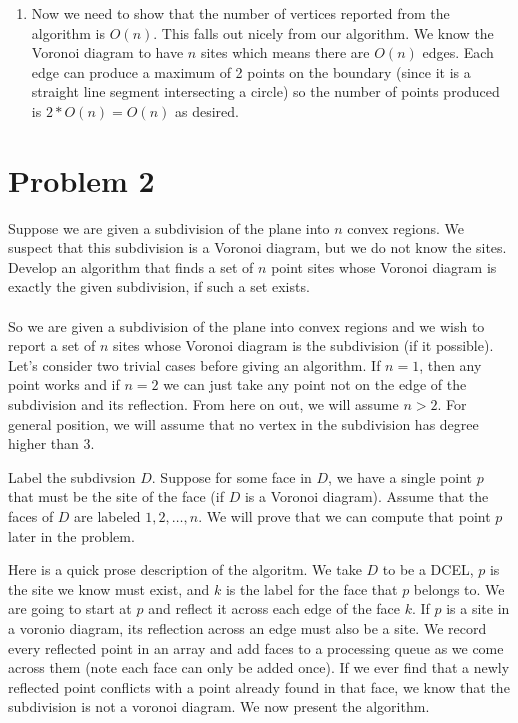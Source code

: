 \documentclass[11pt]{article}
\begin{document}
\begin{enumerate}
    \item Now we need to show that the number of vertices reported from the algorithm is $O(n)$.
    This falls out nicely from our algorithm.
    We know the Voronoi diagram to have $n$ sites which means there are $O(n)$ edges.
    Each edge can produce a maximum of 2 points on the boundary (since it is a straight line segment intersecting a circle) so the number of points produced is $2*O(n) = O(n)$ as desired.
\end{enumerate}

\newpage
\section*{Problem 2}

Suppose we are given a subdivision of the plane into $n$ convex regions. We
suspect that this subdivision is a Voronoi diagram, but we do not know the
sites. Develop an algorithm that finds a set of $n$ point sites whose Voronoi diagram is exactly the given subdivision, if such a set exists. \\\\

\answer
So we are given a subdivision of the plane into convex regions and we wish to report a set of $n$ sites whose Voronoi diagram is the subdivision (if it possible).
Let's consider two trivial cases before giving an algorithm.
If $n=1$, then any point works and if $n=2$ we can just take any point not on the edge of the subdivision and its reflection.
From here on out, we will assume $n > 2$.
For general position, we will assume that no vertex in the subdivision has degree higher than 3.

Label the subdivsion $D$.
Suppose for some face in $D$, we have a single point $p$ that must be the site of the face (if $D$ is a Voronoi diagram).
Assume that the faces of $D$ are labeled $1, 2, \ldots, n$.
We will prove that we can compute that point $p$ later in the problem.

Here is a quick prose description of the algoritm.
We take $D$ to be a DCEL, $p$ is the site we know must exist, and $k$ is the label for the face that $p$ belongs to.
We are going to start at $p$ and reflect it across each edge of the face $k$.
If $p$ is a site in a voronio diagram, its reflection across an edge must also be a site.
We record every reflected point in an array and add faces to a processing queue as we come across them (note each face can only be added once).
If we ever find that a newly reflected point conflicts with a point already found in that face, we know that the subdivision is not a voronoi diagram.
We now present the algorithm.
\end{document}
